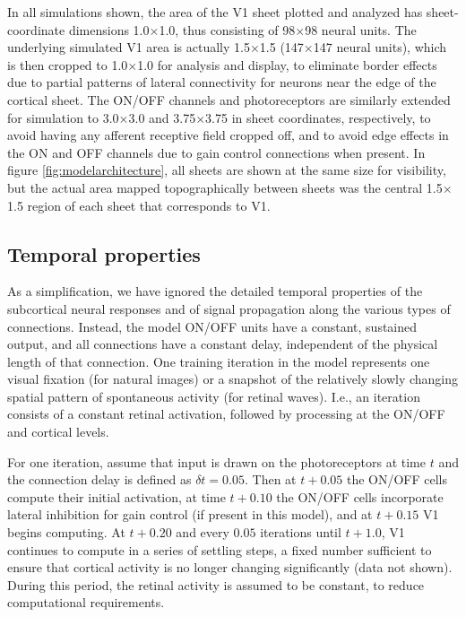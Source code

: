 \documentclass{article}
\begin{document}
In all simulations shown, the area of the V1 sheet plotted and
analyzed has sheet-coordinate dimensions 1.0$\times$1.0, thus
consisting of 98$\times$98 neural units. The underlying simulated V1
area is actually 1.5$\times$1.5 (147$\times$147 neural units), which
is then cropped to 1.0$\times$1.0 for analysis and display, to
eliminate border effects due to partial
patterns of lateral connectivity for neurons
near the edge of the cortical sheet. The ON/OFF channels and photoreceptors are
similarly extended for simulation to 3.0$\times$3.0 and
3.75$\times$3.75 in sheet coordinates, respectively, to avoid having
any afferent receptive field cropped off, and to avoid edge effects in
the ON and OFF channels due to gain control connections when present.
In figure \ref{fig:modelarchitecture}, all sheets are shown at the
same size for visibility, but the actual area mapped topographically
between sheets was the central 1.5$\times$1.5 region of each sheet
that corresponds to V1.



\subsection*{Temporal properties}

As a simplification, we have ignored the detailed temporal properties
of the subcortical neural responses and of signal propagation along
the various types of connections. Instead, the model ON/OFF units have
a constant, sustained output, and all connections have a constant
delay, independent of the physical length of that connection.  One
training iteration in the model represents one visual fixation (for
natural images) or a snapshot of the relatively slowly changing
spatial pattern of spontaneous activity (for retinal waves).  I.e., an
iteration consists of a constant retinal activation, followed by
processing at the ON/OFF and cortical levels.

For one iteration, assume that input is drawn on the photoreceptors at
time $t$ and the connection delay is defined as $\delta t=0.05$. Then
at $t+0.05$ the ON/OFF cells compute their initial activation, at time
$t+0.10$ the ON/OFF cells incorporate lateral inhibition for gain
control (if present in this model), and at $t+0.15$ V1 begins
computing. At $t+0.20$ and every $0.05$ iterations until $t+1.0$, V1
continues to compute in a series of settling steps,
a fixed number sufficient to ensure that cortical
activity is no longer changing significantly (data not shown).
During this period, the retinal activity is assumed to be constant, to
reduce computational requirements.
\end{document}
